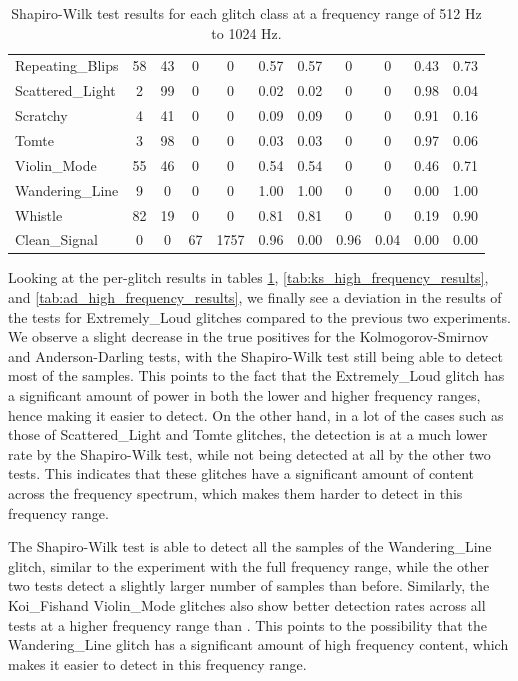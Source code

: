 \documentclass[12pt]{article}
\begin{document}
\begin{table}[H]
\begin{tabular}{lcccccccccc}
  Repeating\_Blips & 58 & 43 & 0 & 0 & 0.57 & 0.57 & 0 & 0 & 0.43 & 0.73 \\
  Scattered\_Light & 2 & 99 & 0 & 0 & 0.02 & 0.02 & 0 & 0 & 0.98 & 0.04 \\
  Scratchy & 4 & 41 & 0 & 0 & 0.09 & 0.09 & 0 & 0 & 0.91 & 0.16 \\
  Tomte & 3 & 98 & 0 & 0 & 0.03 & 0.03 & 0 & 0 & 0.97 & 0.06 \\
  Violin\_Mode & 55 & 46 & 0 & 0 & 0.54 & 0.54 & 0 & 0 & 0.46 & 0.71 \\
  Wandering\_Line & 9 & 0 & 0 & 0 & 1.00 & 1.00 & 0 & 0 & 0.00 & 1.00 \\
  Whistle & 82 & 19 & 0 & 0 & 0.81 & 0.81 & 0 & 0 & 0.19 & 0.90 \\
  Clean\_Signal & 0 & 0 & 67 & 1757 & 0.96 & 0.00 & 0.96 & 0.04 & 0.00 & 0.00 \\
  \bottomrule
  \end{tabular}
  \caption{Shapiro-Wilk test results for each glitch class at a frequency range of 512 Hz to 1024 Hz.}
  \label{tab:shapiro_high_frequency_results}
\end{table}

\noindent Looking at the per-glitch results in tables \ref{tab:shapiro_high_frequency_results}, \ref{tab:ks_high_frequency_results}, and \ref{tab:ad_high_frequency_results}, we finally see a deviation in the results of the tests for Extremely\_Loud glitches compared to the previous two experiments. We observe a slight decrease in the true positives for the Kolmogorov-Smirnov and Anderson-Darling tests, with the Shapiro-Wilk test still being able to detect most of the samples. This points to the fact that the Extremely\_Loud glitch has a significant amount of power in both the lower and higher frequency ranges, hence making it easier to detect. On the other hand, in a lot of the cases such as those of Scattered\_Light and Tomte glitches, the detection is at a much lower rate by the Shapiro-Wilk test, while not being detected at all by the other two tests. This indicates that these glitches have a significant amount of content across the frequency spectrum, which makes them harder to detect in this frequency range.

\medskip
\noindent The Shapiro-Wilk test is able to detect all the samples of the Wandering\_Line glitch, similar to the experiment with the full frequency range, while the other two tests detect a slightly larger number of samples than before. Similarly, the Koi\_Fishand Violin\_Mode glitches also show better detection rates across all tests at a higher frequency range than . This points to the possibility that the Wandering\_Line glitch has a significant amount of high frequency content, which makes it easier to detect in this frequency range.
\end{document}
